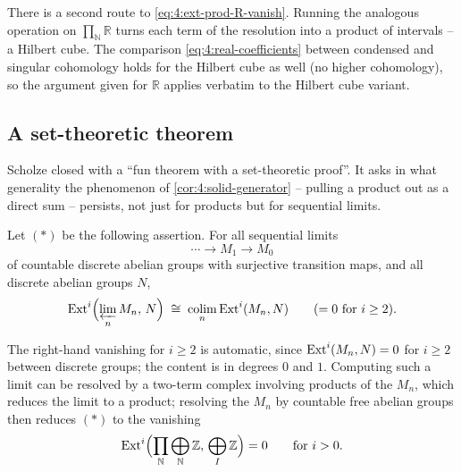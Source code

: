 \begin{remark}
\label{rmk:4:hilbert-cube}
There is a second route to \eqref{eq:4:ext-prod-R-vanish}. Running the analogous
operation on $\prod_{\mathbb{N}}\mathbb{R}$ turns each term of the resolution into
a product of intervals -- a Hilbert cube. The comparison
\eqref{eq:4:real-coefficients} between condensed and singular cohomology holds
for the Hilbert cube as well (no higher cohomology), so the argument given for
$\mathbb{R}$ applies verbatim to the Hilbert cube variant.
\end{remark}

\subsection{A set-theoretic theorem}

Scholze closed with a ``fun theorem with a set-theoretic proof''. It asks in what
generality the phenomenon of \cref{cor:4:solid-generator} -- pulling a product
out as a direct sum -- persists, not just for products but for sequential
limits.

\begin{definition}
\label{def:4:star}
Let $(\ast)$ be the following assertion. For all sequential limits
\begin{equation*}
\cdots\to M_1\to M_0
\end{equation*}
of countable discrete abelian groups with surjective transition maps, and all
discrete abelian groups $N$,
\begin{equation*}
\operatorname{Ext}^{i}\Bigl(\varprojlim_{n}M_n,\,N\Bigr)\;\cong\;
\operatorname*{colim}_{n}\operatorname{Ext}^{i}(M_n,N)\qquad(=0\ \text{for }i\geq2).
\end{equation*}
\end{definition}

The right-hand vanishing for $i\geq2$ is automatic, since $\operatorname{Ext}^i(M_n,N)=0$ for
$i\geq2$ between discrete groups; the content is in degrees $0$ and $1$.
Computing such a limit can be resolved by a two-term complex involving products
of the $M_n$, which reduces the limit to a product; resolving the $M_n$ by
countable free abelian groups then reduces $(\ast)$ to the vanishing
\begin{equation*}
\operatorname{Ext}^{i}\Bigl(\prod_{\mathbb{N}}\bigoplus_{\mathbb{N}}\mathbb{Z},\,
\bigoplus_{I}\mathbb{Z}\Bigr)=0\qquad\text{for }i>0.
\end{equation*}


